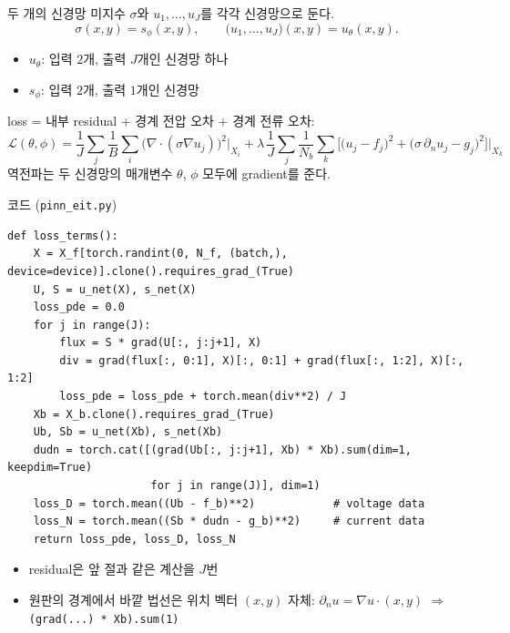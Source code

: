 \documentclass[aspectratio=169,11pt]{beamer}
\newcommand{\loss}{\mathcal{L}}
\begin{document}
\begin{frame}{두 개의 신경망}
미지수 $\sigma$와 $u_1,\dots,u_J$를 각각 신경망으로 둔다.
\[
\sigma(x,y)=s_\phi(x,y),\qquad \big(u_1,\dots,u_J\big)(x,y)=u_\theta(x,y).
\]
\begin{itemize}
\item $u_\theta$: 입력 $2$개, 출력 $J$개인 신경망 하나
\item $s_\phi$: 입력 $2$개, 출력 $1$개인 신경망
\end{itemize}
loss = 내부 residual + 경계 전압 오차 + 경계 전류 오차:
\[
\loss(\theta,\phi)=\frac1J\sum_{j}\frac1{B}\sum_i\big(\nabla\cdot(\sigma\nabla u_j)\big)^2\Big|_{X_i}
+\lambda\,\frac1J\sum_j\frac1{N_b}\sum_k\Big[\big(u_j-f_j\big)^2+\big(\sigma\,\partial_nu_j-g_j\big)^2\Big]\Big|_{X_k}
\]
역전파는 두 신경망의 매개변수 $\theta$, $\phi$ 모두에 gradient를 준다.
\end{frame}

\begin{frame}[fragile]{코드 (\texttt{pinn\_eit.py})}
\begin{lstlisting}
def loss_terms():
    X = X_f[torch.randint(0, N_f, (batch,), device=device)].clone().requires_grad_(True)
    U, S = u_net(X), s_net(X)
    loss_pde = 0.0
    for j in range(J):
        flux = S * grad(U[:, j:j+1], X)
        div = grad(flux[:, 0:1], X)[:, 0:1] + grad(flux[:, 1:2], X)[:, 1:2]
        loss_pde = loss_pde + torch.mean(div**2) / J
    Xb = X_b.clone().requires_grad_(True)
    Ub, Sb = u_net(Xb), s_net(Xb)
    dudn = torch.cat([(grad(Ub[:, j:j+1], Xb) * Xb).sum(dim=1, keepdim=True)
                      for j in range(J)], dim=1)
    loss_D = torch.mean((Ub - f_b)**2)            # voltage data
    loss_N = torch.mean((Sb * dudn - g_b)**2)     # current data
    return loss_pde, loss_D, loss_N
\end{lstlisting}
\begin{itemize}
\item residual은 앞 절과 같은 계산을 $J$번
\item 원판의 경계에서 바깥 법선은 위치 벡터 $(x,y)$ 자체: $\partial_nu=\nabla u\cdot(x,y)$ $\Rightarrow$ \texttt{(grad(...) * Xb).sum(1)}
\end{itemize}
\end{frame}
\end{document}
